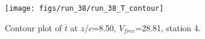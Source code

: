 \begin{figure}[H]
\centering
\texttt{[image: figs/run\_38/run\_38\_T\_contour]}
\caption{Contour plot of $\overline{t}$ at $z/c$=8.50, $V_{free}$=28.81, station 4.}
\label{fig:run_38_T_contour}
\end{figure}


